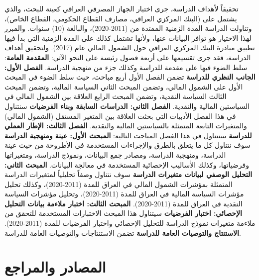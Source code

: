 \documentclass[10pt,a4paper]{report}
\begin{document}
\begin{doublespacing}
تحقيقاً لأهداف الدراسة، جرى اختبار الجهاز المصرفي العراقي كعينة للبحث، والذي يشتمل على (البنك المركزي العراقي، مصارف القطاع الحكومي، القطاع الخاص)، وتناولت الدراسة المدة الزمنية الممتدة من (2011-2020)، والبالغة (10) سنوات. والمبرر لهذا الاختيار هو توافر البيانات عنها، ولأنها تشتمل كذلك على المدة الزمنية التي بدأ فيها تطبيق مبادرة البنك المركزي العراقي حول الشمول المالي عام (2017). ولتحقيق أهداف الدراسة، فقد جرى تقسيمها على أربعة فصول رئيسة على النحو الآتي:
\newline
\textbf{المقدمة العامة}: 
سلط الضوء فيها على مقدمة للدراسة وكذلك جزء من منهجية الدراسة.
\newline
\textbf{الفصل الأول: الجانب النظري للدراسة}
تضمن الفصل الأول أربع مباحث، حيث سلط الضوء في المبحث الأول على الشمول المالي، وتضمن المبحث الثاني السياسة المالية، وتضمن المبحث الثالث السياسة النقدية، وتضمن المبحث الرابع العلاقة بين الشمول المالي في السياستين المالية والنقدية.
\newline
\textbf{الفصل الثاني: الدراسات السابقة وبناء الفرضيات}
سنتناول في هذا الفصل الأدبيات التي بحثت العلاقة بين المتغير المستقل (الشمول المالي) والمتغيرات التابعة المتمثلة بالسياستين المالية والنقدية.
\newline
\textbf{الفصل الثالث: الإطار العملي للدراسة}
سنتناول في هذا الفصل المباحث التالية:
\newline
\textbf{المبحث الأول: عينة ومنهجية الدراسة}
سوف نتناول كل ما يتعلق بالطرق والإجراءات المستخدمة في الأطروحة من حيث عينة الدراسة، ومنهجية الدراسة، ومصادر جمع البيانات، ونموذج الدراسة، ومتغيراتها وفرضياتها، وكذلك الأساليب الإحصائية المستخدمة في معالجة البيانات.
\newline
\textbf{المبحث الثاني: التحليل الوصفي لبيانات متغيرات الدراسة}
سوف نتناول وصفاً تحليلياً لمتغيرات الدراسة المتمثلة بمؤشرات الشمول المالي في العراق للمدة (2011-2020)، وكذلك تحليل مؤشرات السياسة المالية في العراق للمدة (2011-2020)، وتحليل مؤشرات السياسة النقدية في العراق للمدة (2011-2020).
\newline
\textbf{المبحث الثالث: اختبار ملاءمة بيانات التحليل الإحصائي: اختبار الفرضيات}
سيتناول هذا المبحث الاختبارات المستخدمة للتحقق من ملاءمة متغيرات نموذج الدراسة للتحليل الإحصائي واختبار الفرضيات للمدة (2011-2020).
\newline
\textbf{الاستنتاج والتوصيات العامة للدراسة}
تضمن الاستنتاجات والتوصيات العامة للدراسة.








	\end{doublespacing}
	\chapter{المصادر والمراجع}
	\thispagestyle{empty}
	\clearpage
	\pagestyle{plain}
\end{document}
